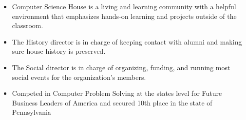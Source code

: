 









\divider



\begin{itemize}
\item Computer Science House is a living and learning community with a helpful environment that emphasizes hands-on learning and projects outside of the classroom.
\item The History director is in charge of keeping contact with alumni and making sure house history is preserved.
\end{itemize}

\smallskip

\begin{itemize}
\item The Social director is in charge of organizing, funding, and running most social events for the organization's members.
\end{itemize}




\begin{itemize}
    \item Competed in Computer Problem Solving at the states level for Future Business Leaders of America and secured 10th place in the state of Pennsylvania 
\end{itemize}










